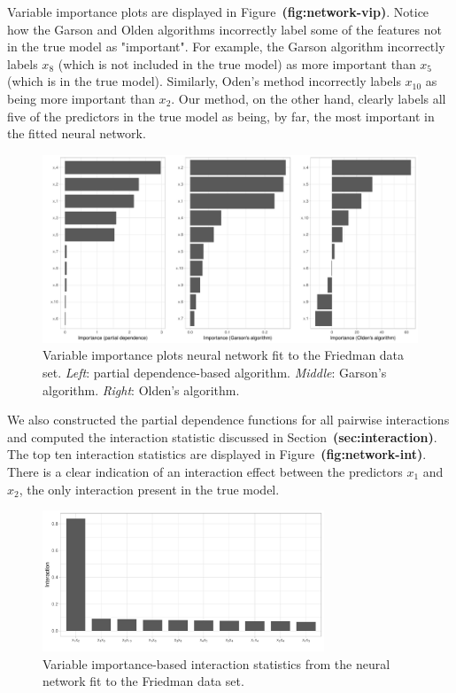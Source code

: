 \documentclass[12pt]{article}
\def\ref#1{\textbf{(#1)}}
\begin{document}
Variable importance plots are displayed in Figure~\ref{fig:network-vip}. Notice how the Garson and Olden algorithms incorrectly label some of the features not in the true model as "important". For example, the Garson algorithm incorrectly labels $x_8$ (which is not included in the true model) as more important than $x_5$ (which is in the true model). Similarly, Oden's method incorrectly labels $x_{10}$ as being more important than $x_2$. Our method, on the other hand, clearly labels all five of the predictors in the true model as being, by far, the most important in the fitted neural network.

\begin{figure}[!htb]
  \centering
  \includegraphics[width=1.0\textwidth]{network-vip}
  \caption{Variable importance plots neural network fit to the Friedman data set. \textit{Left}: partial dependence-based algorithm. \textit{Middle}: Garson's algorithm. \textit{Right}: Olden's algorithm. \label{fig:network-vip}}
\end{figure}

We also constructed the partial dependence functions for all pairwise interactions and computed the interaction statistic discussed in Section~\ref{sec:interaction}. The top ten interaction statistics are displayed in Figure~\ref{fig:network-int}. There is a clear indication of an interaction effect between the predictors $x_1$ and $x_2$, the only interaction present in the true model.

\begin{figure}[!htb]
  \centering
  \includegraphics[width=0.75\textwidth]{network-int}
  \caption{Variable importance-based interaction statistics from the neural network fit to the Friedman data set. \label{fig:network-int}}
\end{figure}
\end{document}
